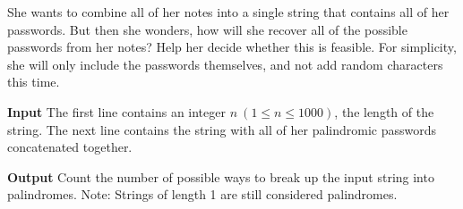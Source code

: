 \normalfont\documentclass[letterpaper,11pt]{article}
\begin{document}
She wants to combine all of her notes into a single string that contains all of her passwords. But then she wonders, how will she recover all of the possible passwords from her notes? Help her decide whether this is feasible. For simplicity, she will only include the passwords themselves, and not add random characters this time.

\textbf{Input} \newline
The first line contains an integer $n \ (1 \leq n \leq 1000)$, the length of the string. The next line contains the string with all of her palindromic passwords concatenated together.

\textbf{Output}
Count the number of possible ways to break up the input string into palindromes. Note: Strings of length 1 are still considered palindromes.
\end{document}
